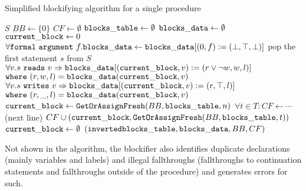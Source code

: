 \begin{algorithm}[t]
    \caption{Simplified blockifying algorithm for a single procedure}
    \label{alg:blockifying}
    \begin{algorithmic}
        \Require $S$ 
        \State $BB \gets \{0\}$ 
        \State $CF \gets \emptyset$ 
        \State $\mathtt{blocks\_table} \gets \emptyset$ 
        \State $\mathtt{blocks\_data} \gets \emptyset$ 
        \State $\mathtt{current\_block} \gets 0$ 
        \State $\forall \mathtt{formal\ argument}\ f . \mathtt{blocks\_data} \gets \mathtt{blocks\_data} [ (0, f) := (\bot, \top, \bot) ]$
            \State pop the first statement $s$ from $S$
                \State {}
                \State $\forall v . s\ \mathtt{reads}\ v \Rightarrow \mathtt{blocks\_data} [ (\mathtt{current\_block}, v) := (r \lor \neg w, w, l) ]$
                \State \quad\quad $\mathtt{where}\ (r, w, l) = \mathtt{blocks\_data}(\mathtt{current\_block}, v)$
                \State $\forall v . s\ \mathtt{writes}\ v \Rightarrow \mathtt{blocks\_data} [ (\mathtt{current\_block}, v) := (r, \top, l) ]$
                \State \quad\quad $\mathtt{where}\ (r, \_, l) = \mathtt{blocks\_data}(\mathtt{current\_block}, v)$
                \State {}
            \EndIf
                \State $\mathtt{current\_block} \gets \mathtt{GetOrAssignFresh}(BB, \mathtt{blocks\_table},n)$
                \State $\forall t \in T: CF \gets \cdots$  (next line)
                \State $CF \cup (\mathtt{current\_block}, \mathtt{GetOrAssignFresh}(BB, \mathtt{blocks\_table},t))$
                \State $\mathtt{current\_block} \gets \emptyset$
            \EndIf
            \State \Return $(\mathtt{inverted } \mathtt{blocks\_table}, \mathtt{blocks\_data}, BB, CF)$
        \EndWhile
    \end{algorithmic}
\end{algorithm}

Not shown in the algorithm, the blockifier also identifies duplicate declarations (mainly variables and labels) and illegal fallthroughs (fallthroughs to continuation statements and fallthroughs outside of the procedure) and generates errors for such.

